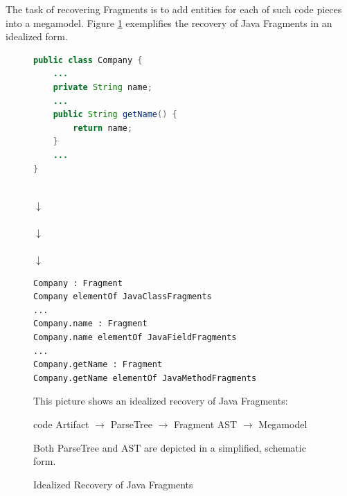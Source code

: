 The task of recovering \glspl{Fragment} is to add entities for each of such code pieces into a megamodel.
Figure \ref{figure:IdealizedRecoveryOfJavaFragments} exemplifies the recovery of \gls{Java} \glspl{Fragment} in an idealized form.
\begin{figure}[h!]
\begin{center}
\begin{minipage}{0.5\textwidth}
\begin{lstlisting}[language=Java,numbers=none]
public class Company {
	...
	private String name;
	...
	public String getName() {
		return name;
	}
	...
}
\end{lstlisting}
\end{minipage}
\\\vspace*{5mm}
{
\LARGE
\bfseries
$\downarrow$
}
\\\vspace*{5mm}
\\\vspace*{5mm}
{
\LARGE
\bfseries
$\downarrow$
}
\\\vspace*{5mm}
\\\vspace*{5mm}
{
\LARGE
\bfseries
$\downarrow$
}
\\\vspace*{5mm}
\begin{minipage}{0.5\textwidth}
\begin{lstlisting}[numbers=none]
Company : Fragment
Company elementOf JavaClassFragments
...
Company.name : Fragment
Company.name elementOf JavaFieldFragments
...
Company.getName : Fragment
Company.getName elementOf JavaMethodFragments
\end{lstlisting}
\end{minipage}
\end{center}
{
\scriptsize
This picture shows an idealized recovery of \gls{Java} \glspl{Fragment}:
\begin{center}
code \gls{Artifact}
$\rightarrow$
\gls{ParseTree}
$\rightarrow$
\gls{Fragment} \gls{AST}
$\rightarrow$
\gls{Megamodel}
\end{center} 
Both \gls{ParseTree} and \gls{AST} are depicted in a simplified, schematic form.
}
\caption{Idealized Recovery of Java Fragments}
\label{figure:IdealizedRecoveryOfJavaFragments}
\end{figure}
